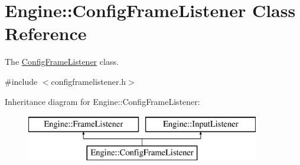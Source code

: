 \hypertarget{classEngine_1_1ConfigFrameListener}{}\section{Engine\+:\+:Config\+Frame\+Listener Class Reference}
\label{classEngine_1_1ConfigFrameListener}


The \hyperlink{classEngine_1_1ConfigFrameListener}{Config\+Frame\+Listener} class.  




{\ttfamily \#include $<$configframelistener.\+h$>$}

Inheritance diagram for Engine\+:\+:Config\+Frame\+Listener\+:\begin{figure}[H]
\begin{center}
\leavevmode
\includegraphics[height=2.000000cm]{classEngine_1_1ConfigFrameListener}
\end{center}
\end{figure}
